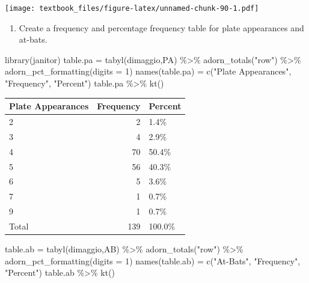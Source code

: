 \documentclass[
  11pt,
]{book}
\newenvironment{Shaded}{\begin{snugshade}}{\end{snugshade}}
\newcommand{\AttributeTok}[1]{\textcolor[rgb]{0.77,0.63,0.00}{#1}}
\newcommand{\DecValTok}[1]{\textcolor[rgb]{0.00,0.00,0.81}{#1}}
\newcommand{\FunctionTok}[1]{\textcolor[rgb]{0.00,0.00,0.00}{#1}}
\newcommand{\NormalTok}[1]{#1}
\newcommand{\OtherTok}[1]{\textcolor[rgb]{0.56,0.35,0.01}{#1}}
\newcommand{\SpecialCharTok}[1]{\textcolor[rgb]{0.00,0.00,0.00}{#1}}
\newcommand{\StringTok}[1]{\textcolor[rgb]{0.31,0.60,0.02}{#1}}
\providecommand{\tightlist}{%
  \setlength{\itemsep}{0pt}\setlength{\parskip}{0pt}}
\theoremstyle{definition}
\theoremstyle{definition}
\theoremstyle{definition}
\theoremstyle{definition}
\theoremstyle{remark}
\begin{document}
\texttt{[image: textbook\_files/figure-latex/unnamed-chunk-90-1.pdf]}

\vfill
\newpage

\begin{enumerate}
\def\labelenumi{(\alph{enumi})}
\setcounter{enumi}{1}
\tightlist
\item
  Create a frequency and percentage frequency table for plate appearances and at-bats.
\end{enumerate}

\begin{Shaded}
\begin{Highlighting}[]
\FunctionTok{library}\NormalTok{(janitor)}
\NormalTok{table.pa }\OtherTok{=} \FunctionTok{tabyl}\NormalTok{(dimaggio,PA) }\SpecialCharTok{\%\textgreater{}\%} 
  \FunctionTok{adorn\_totals}\NormalTok{(}\StringTok{"row"}\NormalTok{) }\SpecialCharTok{\%\textgreater{}\%}
  \FunctionTok{adorn\_pct\_formatting}\NormalTok{(}\AttributeTok{digits =} \DecValTok{1}\NormalTok{)}
\FunctionTok{names}\NormalTok{(table.pa) }\OtherTok{=} \FunctionTok{c}\NormalTok{(}\StringTok{"Plate Appearances"}\NormalTok{, }\StringTok{"Frequency"}\NormalTok{, }\StringTok{"Percent"}\NormalTok{)}
\NormalTok{table.pa }\SpecialCharTok{\%\textgreater{}\%} \FunctionTok{kt}\NormalTok{()}
\end{Highlighting}
\end{Shaded}

\begin{table}[H]
\centering
\begin{tabular}{lrl}
\toprule
Plate Appearances & Frequency & Percent\\
\midrule
2 & 2 & 1.4\%\\
3 & 4 & 2.9\%\\
4 & 70 & 50.4\%\\
5 & 56 & 40.3\%\\
6 & 5 & 3.6\%\\
7 & 1 & 0.7\%\\
9 & 1 & 0.7\%\\
Total & 139 & 100.0\%\\
\bottomrule
\end{tabular}
\end{table}

\begin{Shaded}
\begin{Highlighting}[]
\NormalTok{table.ab }\OtherTok{=} \FunctionTok{tabyl}\NormalTok{(dimaggio,AB) }\SpecialCharTok{\%\textgreater{}\%} 
  \FunctionTok{adorn\_totals}\NormalTok{(}\StringTok{"row"}\NormalTok{) }\SpecialCharTok{\%\textgreater{}\%}
  \FunctionTok{adorn\_pct\_formatting}\NormalTok{(}\AttributeTok{digits =} \DecValTok{1}\NormalTok{)}
\FunctionTok{names}\NormalTok{(table.ab) }\OtherTok{=} \FunctionTok{c}\NormalTok{(}\StringTok{"At{-}Bats"}\NormalTok{, }\StringTok{"Frequency"}\NormalTok{, }\StringTok{"Percent"}\NormalTok{)}
\NormalTok{table.ab }\SpecialCharTok{\%\textgreater{}\%} \FunctionTok{kt}\NormalTok{()}
\end{Highlighting}
\end{Shaded}
\end{document}
